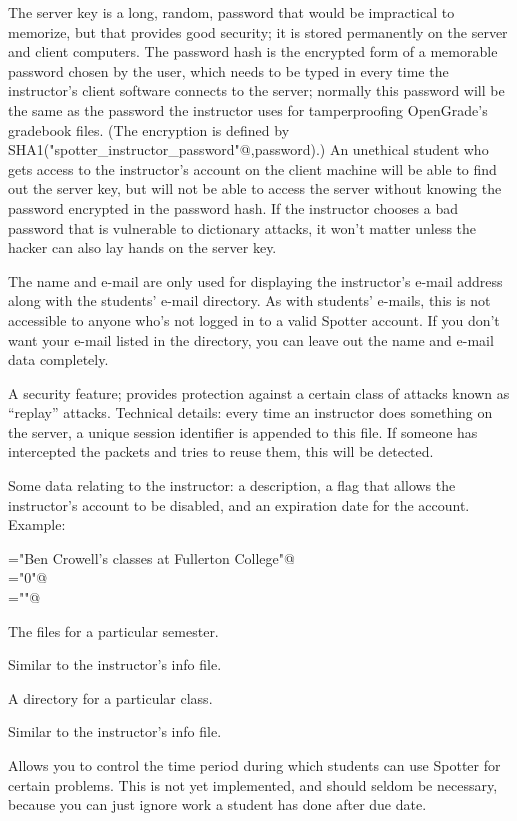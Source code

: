 \documentclass{doc}
\begin{document}
The server key is a long, random, password that would be impractical to memorize, but that
provides good security; it is stored permanently on the server and client computers.
The password hash is the encrypted form of a memorable password chosen by the user, which
needs to be typed in every time the instructor's client software connects
to the server; normally this password will be the same as the password the instructor uses
for tamperproofing OpenGrade's gradebook files. (The encryption is defined by
SHA1(\verb@"spotter_instructor_password"@,password).)
An unethical student who gets access to the
instructor's account on the client machine will be able to find out the server key, but will not
be able to access the server without knowing the password encrypted in the password hash.
If the instructor chooses a bad password that is vulnerable to dictionary attacks, it won't
matter unless the hacker can also lay hands on the server key.

The name and e-mail are only used for displaying the instructor's e-mail address along with the
students' e-mail directory. As with students' e-mails, this is not accessible to anyone who's
not logged in to a valid Spotter account. If you don't want your e-mail listed in the directory,
you can leave out the name and e-mail data completely.

 A security feature; provides protection against a certain
class of attacks known as ``replay'' attacks. Technical details: every time an instructor does something
on the server, a unique session identifier is appended to this file. If someone
has intercepted the packets and tries to reuse them, this will be detected.

 Some data relating to the instructor: a description, a flag that allows the
instructor's account to be disabled, and an expiration date for the account.
Example:

\verb@description="Ben Crowell's classes at Fullerton College"@\\
\verb@disable="0"@\\
\verb@expire=""@

 The files for a particular semester.

 Similar to the instructor's info file.

 A directory for a particular class.

 Similar to the instructor's info file.

 Allows you to control the time period during which students can use
Spotter for certain problems. This is not yet implemented, and should seldom be
necessary, because you can just ignore work a student has done after
due date.
\end{document}
